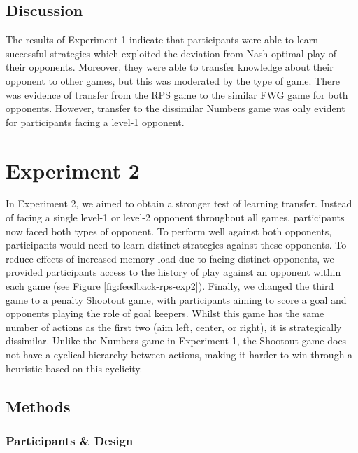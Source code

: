 \documentclass[smallextended]{svjour3}       %
\begin{document}
\hypertarget{discussion}{%
\subsection{Discussion}\label{discussion}}

The results of Experiment 1 indicate that participants were able to
learn successful strategies which exploited the deviation from
Nash-optimal play of their opponents. Moreover, they were able to
transfer knowledge about their opponent to other games, but this was
moderated by the type of game. There was evidence of transfer from the
RPS game to the similar FWG game for both opponents. However, transfer
to the dissimilar Numbers game was only evident for participants facing
a level-1 opponent.

\hypertarget{experiment-2}{%
\section{Experiment 2}\label{experiment-2}}

In Experiment 2, we aimed to obtain a stronger test of learning
transfer. Instead of facing a single level-1 or level-2 opponent
throughout all games, participants now faced both types of opponent. To
perform well against both opponents, participants would need to learn
distinct strategies against these opponents. To reduce effects of
increased memory load due to facing distinct opponents, we provided
participants access to the history of play against an opponent within
each game (see Figure \ref{fig:feedback-rps-exp2}). Finally, we changed
the third game to a penalty Shootout game, with participants aiming to
score a goal and opponents playing the role of goal keepers. Whilst this
game has the same number of actions as the first two (aim left, center,
or right), it is strategically dissimilar. Unlike the Numbers game in
Experiment 1, the Shootout game does not have a cyclical hierarchy
between actions, making it harder to win through a heuristic based on
this cyclicity.

\hypertarget{methods-1}{%
\subsection{Methods}\label{methods-1}}

\hypertarget{participants-design}{%
\subsubsection{Participants \& Design}\label{participants-design}}
\end{document}
